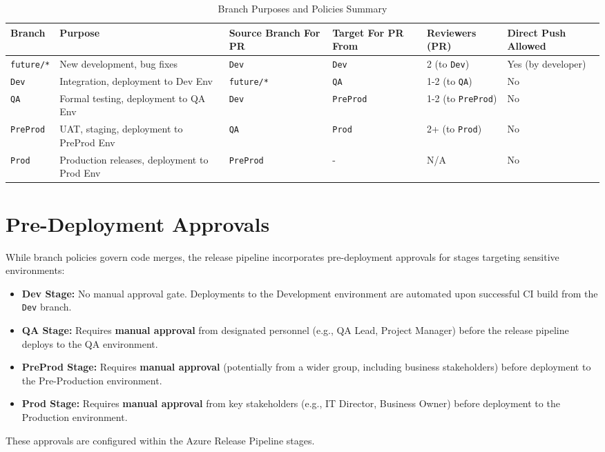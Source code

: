 \begin{table}[htbp]
    \centering
    \caption{Branch Purposes and Policies Summary}
    \label{tab:BranchPoliciesSummary}
    \begin{tabular}{|l|p{3.5cm}|l|l|l|l|}
        \hline
        \textbf{Branch} & \textbf{Purpose} & \textbf{Source Branch For PR} & \textbf{Target For PR From} & \textbf{Reviewers (PR)} & \textbf{Direct Push Allowed} \\
        \hline
        \texttt{future/*} & New development, bug fixes & \texttt{Dev} & \texttt{Dev} & 2 (to \texttt{Dev}) & Yes (by developer) \\
        \hline
        \texttt{Dev} & Integration, deployment to Dev Env & \texttt{future/*} & \texttt{QA} & 1-2 (to \texttt{QA}) & No \\
        \hline
        \texttt{QA} & Formal testing, deployment to QA Env & \texttt{Dev} & \texttt{PreProd} & 1-2 (to \texttt{PreProd}) & No \\
        \hline
        \texttt{PreProd} & UAT, staging, deployment to PreProd Env & \texttt{QA} & \texttt{Prod} & 2+ (to \texttt{Prod}) & No \\
        \hline
        \texttt{Prod} & Production releases, deployment to Prod Env & \texttt{PreProd} & - & N/A & No \\
        \hline
    \end{tabular}
\end{table}

\section{Pre-Deployment Approvals}
\label{sec:PreDeploymentApprovals}

While branch policies govern code merges, the release pipeline incorporates pre-deployment approvals for stages targeting sensitive environments:

\begin{itemize}
    \item \textbf{Dev Stage:} No manual approval gate. Deployments to the Development environment are automated upon successful CI build from the \texttt{Dev} branch.
    \item \textbf{QA Stage:} Requires \textbf{manual approval} from designated personnel (e.g., QA Lead, Project Manager) before the release pipeline deploys to the QA environment.
    \item \textbf{PreProd Stage:} Requires \textbf{manual approval} (potentially from a wider group, including business stakeholders) before deployment to the Pre-Production environment.
    \item \textbf{Prod Stage:} Requires \textbf{manual approval} from key stakeholders (e.g., IT Director, Business Owner) before deployment to the Production environment.
\end{itemize}
These approvals are configured within the Azure Release Pipeline stages.

